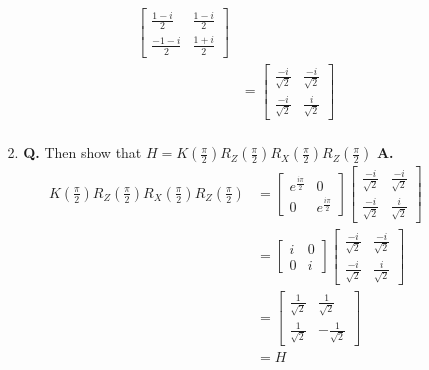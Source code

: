 \documentclass[main.tex]{subfiles}
\begin{document}
\begin{enumerate}
\begin{enumerate}
\begin{align*}
                                        \left[\begin{array}{ll}\frac{1-i}{2} & \frac{1-i}{2} \\
                                        \frac{-1-i}{2}  & \frac{1+i}{2} \end{array}\right]\\
                                        & = \left[\begin{array}{ll}\frac{-i}{\sqrt{2}} & \frac{-i}{\sqrt{2}} \\
                                        \frac{-i}{\sqrt{2}} & \frac{i}{\sqrt{2}} \end{array}\right]\\
    \end{align*}
    \item [2.] \textbf{Q.} Then show that $H=K\left(\frac{\pi}{2}\right) R_{Z}\left(\frac{\pi}{2}\right) R_{X}\left(\frac{\pi}{2}\right) R_{Z}\left(\frac{\pi}{2}\right)$ \textbf{A.}
    \begin{align*}
        K\left(\frac{\pi}{2}\right)
        R_{Z}\left(\frac{\pi}{2}\right)
        R_{X}\left(\frac{\pi}{2}\right)
        R_{Z}\left(\frac{\pi}{2}\right) & = \left[\begin{array}{ll}e^{\frac{i\pi}{2}} & 0 \\ 
                                        0 & e^{\frac{i\pi}{2}} \end{array}\right]
                                        \left[\begin{array}{ll}\frac{-i}{\sqrt{2}} & \frac{-i}{\sqrt{2}} \\
                                        \frac{-i}{\sqrt{2}} & \frac{i}{\sqrt{2}} \end{array}\right]\\
                                        & = \left[\begin{array}{ll}i & 0 \\ 0 & i \end{array}\right]
                                        \left[\begin{array}{ll}\frac{-i}{\sqrt{2}} & \frac{-i}{\sqrt{2}} \\
                                        \frac{-i}{\sqrt{2}} & \frac{i}{\sqrt{2}} \end{array}\right]\\
                                        & = \left[\begin{array}{cc} \frac{1}{\sqrt{2}} & \frac{1}{\sqrt{2}} \\ \frac{1}{\sqrt{2}} & -\frac{1}{\sqrt{2}} \end{array}\right]\\
                                        & = H
    \end{align*}
\end{enumerate}


\end{enumerate}
\end{document}
